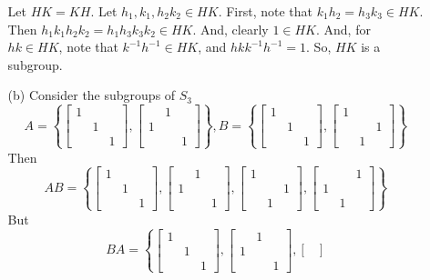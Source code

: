 \documentclass[12pt]{article}
\begin{document}
\begin{itemize}
\begin{itemize}
Let $HK = KH$. Let $h_1, k_1, h_2k_2 \in HK$. First, note that $k_1h_2 = h_3k_3 \in HK$. Then $h_1k_1h_2k_2 = h_1h_3k_3k_2 \in HK$. And, clearly $1 \in HK$. And, for $hk \in HK$, note that $k^{-1}h^{-1} \in HK$, and $hkk^{-1}h^{-1} = 1$. So, $HK$ is a subgroup.
\item[(b)]
Consider the subgroups of $S_3$
$$A = \left\lbrace \begin{bmatrix}
1 \\
& 1 \\
& & 1
\end{bmatrix}, \begin{bmatrix}
& 1 \\
1 \\
& & 1
\end{bmatrix} \right\rbrace, B = \left\lbrace \begin{bmatrix}
1 \\
& 1 \\
& & 1
\end{bmatrix}, \begin{bmatrix}
1 \\
& & 1 \\
& 1
\end{bmatrix} \right\rbrace$$
Then
$$AB = \left\lbrace \begin{bmatrix}
1 \\
& 1 \\
& & 1
\end{bmatrix}, \begin{bmatrix}
& 1 \\
1 \\
& & 1
\end{bmatrix}, \begin{bmatrix}
1 \\
& & 1 \\
& 1
\end{bmatrix}, \begin{bmatrix}
& & 1 \\
1 \\
& 1
\end{bmatrix} \right\rbrace$$
But
$$BA = \left\lbrace \begin{bmatrix}
1 \\
& 1 \\
& & 1
\end{bmatrix}, \begin{bmatrix}
& 1 \\
1 \\
& & 1
\end{bmatrix}, \begin{bmatrix}

\end{bmatrix}$$
\end{itemize}
\end{itemize}
\end{document}
